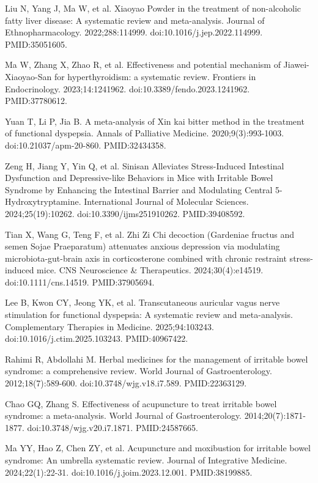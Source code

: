 \documentclass[12pt,oneside]{book}
\newcommand{\reff}[2]{\par\hangindent=7mm\hangafter=1\noindent[#1]\hspace{2mm}#2\par}
\begin{document}
\reff{36}{Liu N, Yang J, Ma W, et al. Xiaoyao Powder in the treatment of non-alcoholic fatty liver disease: A systematic review and meta-analysis. Journal of Ethnopharmacology. 2022;288:114999. doi:10.1016/j.jep.2022.114999. PMID:35051605.}

\reff{37}{Ma W, Zhang X, Zhao R, et al. Effectiveness and potential mechanism of Jiawei-Xiaoyao-San for hyperthyroidism: a systematic review. Frontiers in Endocrinology. 2023;14:1241962. doi:10.3389/fendo.2023.1241962. PMID:37780612.}

\reff{38}{Yuan T, Li P, Jia B. A meta-analysis of Xin kai bitter method in the treatment of functional dyspepsia. Annals of Palliative Medicine. 2020;9(3):993-1003. doi:10.21037/apm-20-860. PMID:32434358.}

\reff{39}{Zeng H, Jiang Y, Yin Q, et al. Sinisan Alleviates Stress-Induced Intestinal Dysfunction and Depressive-like Behaviors in Mice with Irritable Bowel Syndrome by Enhancing the Intestinal Barrier and Modulating Central 5-Hydroxytryptamine. International Journal of Molecular Sciences. 2024;25(19):10262. doi:10.3390/ijms251910262. PMID:39408592.}

\reff{40}{Tian X, Wang G, Teng F, et al. Zhi Zi Chi decoction (Gardeniae fructus and semen Sojae Praeparatum) attenuates anxious depression via modulating microbiota-gut-brain axis in corticosterone combined with chronic restraint stress-induced mice. CNS Neuroscience \& Therapeutics. 2024;30(4):e14519. doi:10.1111/cns.14519. PMID:37905694.}

\reff{41}{Lee B, Kwon CY, Jeong YK, et al. Transcutaneous auricular vagus nerve stimulation for functional dyspepsia: A systematic review and meta-analysis. Complementary Therapies in Medicine. 2025;94:103243. doi:10.1016/j.ctim.2025.103243. PMID:40967422.}

\reff{42}{Rahimi R, Abdollahi M. Herbal medicines for the management of irritable bowel syndrome: a comprehensive review. World Journal of Gastroenterology. 2012;18(7):589-600. doi:10.3748/wjg.v18.i7.589. PMID:22363129.}

\reff{43}{Chao GQ, Zhang S. Effectiveness of acupuncture to treat irritable bowel syndrome: a meta-analysis. World Journal of Gastroenterology. 2014;20(7):1871-1877. doi:10.3748/wjg.v20.i7.1871. PMID:24587665.}

\reff{44}{Ma YY, Hao Z, Chen ZY, et al. Acupuncture and moxibustion for irritable bowel syndrome: An umbrella systematic review. Journal of Integrative Medicine. 2024;22(1):22-31. doi:10.1016/j.joim.2023.12.001. PMID:38199885.}
\end{document}
